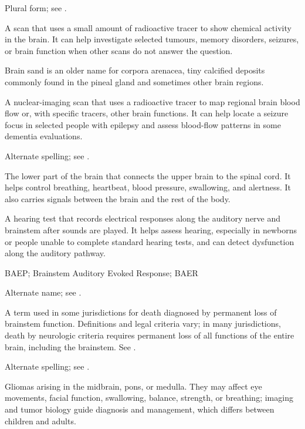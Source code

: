  Plural form; see .

 A scan that uses a small amount of radioactive tracer to show chemical activity in the brain. It can help investigate selected tumours, memory disorders, seizures, or brain function when other scans do not answer the question.

 Brain sand is an older name for corpora arenacea, tiny calcified deposits commonly found in the pineal gland and sometimes other brain regions.

 A nuclear-imaging scan that uses a radioactive tracer to map regional brain blood flow or, with specific tracers, other brain functions. It can help locate a seizure focus in selected people with epilepsy and assess blood-flow patterns in some dementia evaluations.

 Alternate spelling; see .

 The lower part of the brain that connects the upper brain to
the spinal cord. It helps control breathing, heartbeat, blood pressure,
swallowing, and alertness. It also carries signals between the brain and the
rest of the body.

 A hearing test that records electrical responses along the auditory nerve and brainstem after sounds are played. It helps assess hearing, especially in newborns or people unable to complete standard hearing tests, and can detect dysfunction along the auditory pathway.

\synonyms
BAEP; Brainstem Auditory Evoked Response; BAER

 Alternate name; see .

 A term used in some jurisdictions for death diagnosed by permanent loss of brainstem function. Definitions and legal criteria vary; in many jurisdictions, death by neurologic criteria requires permanent loss of all functions of the entire brain, including the brainstem. See .

 Alternate spelling; see .

 Gliomas arising in the midbrain, pons, or medulla. They may affect eye movements, facial function, swallowing, balance, strength, or breathing; imaging and tumor biology guide diagnosis and management, which differs between children and adults.

